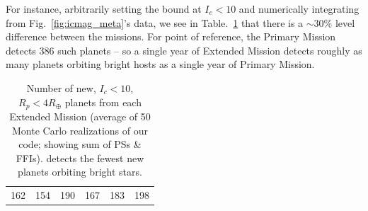 For instance, arbitrarily setting the bound at $I_c<10$ and numerically integrating from Fig.~\ref{fig:icmag_meta}'s data, we see in Table.~\ref{tab:icmag_meta} that there is a $\sim30\%$ level difference between the missions.
For point of reference, the Primary Mission detects 386 such planets -- so a single year of Extended Mission detects roughly as many planets orbiting bright hosts as a single year of Primary Mission.
\begin{table}[!t]
	\centering
	\caption{Number of new, $I_c<10$, $R_p<4R_\oplus$ planets from each Extended Mission (average of 50 Monte Carlo realizations of our code; showing sum of PSs \& FFIs). \npole\:detects the fewest new planets orbiting bright stars.}
	\label{tab:icmag_meta}
	\begin{tabular}{|c|c|c|c|c|c|}
		\hline
		\nhemi & \npole & \shemiAvoid & \elong & \eshort & \hemis \\ \hline
		162    & 154    & 190         & 167    & 183     & 198    \\ \hline
	\end{tabular}
\end{table}

